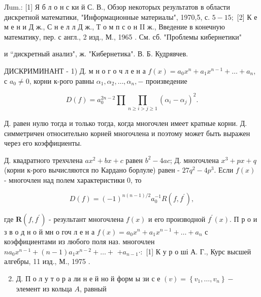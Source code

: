 \documentclass[10pt]{article}
\begin{document}
Лum.: [1] Я б л о н с ки й С. В., Обзор некоторых результатов в области дискретной математики, "Информационные материалы", 1970,5, с. $5-15 ;$ [2] К е м е н и Д ж., С н е л л Д ж., Т о м п с о н II ж., Введение в конечную математику, пер. с англ., 2 изд., М., 1965 . См. сб. "Проблемы кибернетики"

и “дискретный анализ", ж. "Кибернетика". В. Б. Кудрявчев.



ДИСКРИМИНАНТ - 1) Д. м н о г о ч л е н а $f(x)=a_{0} x^{n}+a_{1} x^{n-1}+\ldots+a_{n}$, с $a_{0} \neq 0$, корни к-рого равны $\alpha_{1}, \alpha_{2}, \ldots, \alpha_{n},-$ произведение



\[

D(f)=a_{0}^{2 n-2} \prod \prod_{n \geqslant i>j \geqslant 1}\left(\alpha_{i}-\alpha_{j}\right)^{2} .

\]



Д. равен нулю тогда и только тогда, когда многочлен имеет кратные корни. Д. симметричен относительно корней многочлена и поэтому может быть выражен через его коэффициенты.



Д. квадратного трехчлена $a x^{2}+b x+c$ равен $b^{2}-4 a c$; Д. многочлена $x^{3}+p x+q$ (корни к-рого вычисляются по Кардано борлуле) равен - $27 q^{2}-4 p^{3}$. Если $f(x)$ - многочлен над полем характеристики 0, то



\[

D(f)=(-1)^{n(n-1) / 2} a_{0}^{-1} R\left(f, f^{\prime}\right),

\]



где $\boldsymbol{R}\left(f, f^{\prime}\right)$ - результант многочлена $f(x)$ и его производной $f^{\prime}(x)$. П р о и з в о д н о й мн о гоч л е н а $f(x)=a_{0} x^{n}+a_{1} x^{n-1}+\ldots+a_{n}$ с коэффициентами из любого поля наз. многочлен $n a_{0} x^{n-1}+(n-1) a_{1} x^{n-2}+\ldots+$ $+a_{n-1} \cdot:$ [1] К у р о ші А. Г., Курс высшей алгебры, 11 изд., М., 1975 .



\begin{enumerate}

  \setcounter{enumi}{1}

  \item Д. П о л у т о р а ли н е й но й форм ы зи с е $(v)=\left\{v_{1}, \ldots, v_{n}\right\}-$ элемент из кольца $A$, равный

\end{enumerate}
\end{document}
